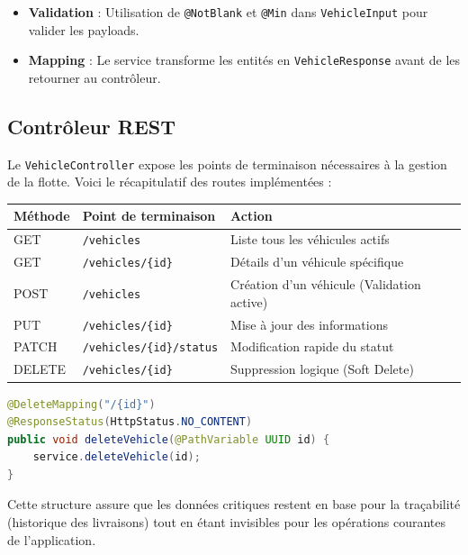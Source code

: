\documentclass[12pt,a4paper]{article}
\begin{document}
\begin{itemize}
    \item \textbf{Validation} : Utilisation de \texttt{@NotBlank} et \texttt{@Min} dans \texttt{VehicleInput} pour valider les payloads.
    \item \textbf{Mapping} : Le service transforme les entités en \texttt{VehicleResponse} avant de les retourner au contrôleur.
\end{itemize}

\subsection{Contrôleur REST}
Le \texttt{VehicleController} expose les points de terminaison nécessaires à la gestion de la flotte. Voici le récapitulatif des routes implémentées :

\begin{center}
\begin{tabular}{|l|l|l|}
  \hline
  \rowcolor{primary!10}
  \textbf{Méthode} & \textbf{Point de terminaison} & \textbf{Action} \\
  \hline
  GET    & \texttt{/vehicles}          & Liste tous les véhicules actifs \\
  GET    & \texttt{/vehicles/\{id\}}   & Détails d'un véhicule spécifique \\
  POST   & \texttt{/vehicles}          & Création d'un véhicule (Validation active) \\
  PUT    & \texttt{/vehicles/\{id\}}   & Mise à jour des informations \\
  PATCH  & \texttt{/vehicles/\{id\}/status} & Modification rapide du statut \\
  DELETE & \texttt{/vehicles/\{id\}}   & Suppression logique (Soft Delete) \\
  \hline
\end{tabular}
\end{center}

\begin{lstlisting}[language=Java, caption=Extrait du contrôleur pour la suppression logique]
@DeleteMapping("/{id}")
@ResponseStatus(HttpStatus.NO_CONTENT)
public void deleteVehicle(@PathVariable UUID id) {
    service.deleteVehicle(id);
}
\end{lstlisting}

Cette structure assure que les données critiques restent en base pour la traçabilité (historique des livraisons) tout en étant invisibles pour les opérations courantes de l'application.
\end{document}

